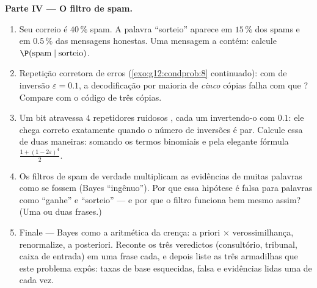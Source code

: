 \begin{problem}
\medskip
\noindent\textbf{Parte IV --- O filtro de spam.}
\begin{enumerate}[resume]
  \item Seu correio é $40\,\%$ spam. A palavra ``sorteio''
        aparece em $15\,\%$ dos spams e em $0.5\,\%$ das
        mensagens honestas. Uma mensagem a contém: calcule
        $\P(\text{spam} \mid \text{sorteio})$.
  \item Repetição corretora de erros
        (\cref{exo:g12:condprob:8} continuado): com
         de inversão $\varepsilon = 0.1$, a
        decodificação por maioria de \emph{cinco} cópias falha
        com que ? Compare com o código de três
        cópias.
  \item Um bit atravessa $4$ repetidores ruidosos
        , cada um invertendo-o com 
        $0.1$: ele chega correto exatamente quando o número de
        inversões é par. Calcule essa  de duas
        maneiras: somando os termos binomiais e pela elegante
        fórmula $\frac{1 + (1 - 2\varepsilon)^4}{2}$.
  \item Os filtros de spam de verdade multiplicam as evidências
        de muitas palavras como se fossem  (Bayes
        ``ingênuo''). Por que essa hipótese é falsa para
        palavras como ``ganhe'' e ``sorteio'' --- e por que o
        filtro funciona bem mesmo assim? (Uma ou duas frases.)
  \item Finale --- Bayes como a aritmética da crença: a priori
        $\times$ verossimilhança, renormalize, a posteriori.
        Reconte os três veredictos (consultório, tribunal,
        caixa de entrada) em uma frase cada, e depois liste as
        três armadilhas que este problema expôs: taxas de base
        esquecidas,  falsa e evidências lidas uma
        de cada vez.
\end{enumerate}
\end{problem}
